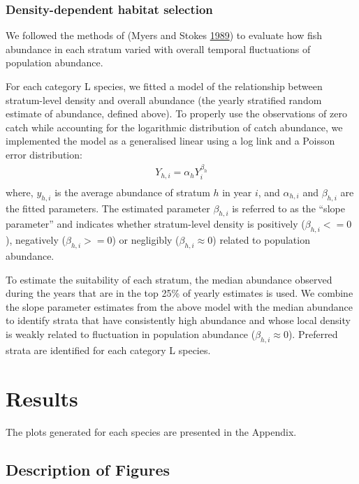 \documentclass[12pt]{article}\usepackage[]{graphicx}\usepackage[]{color}
\begin{document}
\hypertarget{density-dependent-habitat-selection}{%
\subsubsection{Density-dependent habitat selection}\label{density-dependent-habitat-selection}}

We followed the methods of (Myers and Stokes \protect\hyperlink{ref-Myers:Stokes:1989}{1989}) to evaluate how fish abundance in each stratum varied with overall temporal fluctuations of population abundance.

For each category L species, we fitted a model of the relationship between stratum-level density and overall abundance (the yearly stratified random estimate of abundance, defined above). To properly use the observations of zero catch while accounting for the logarithmic distribution of catch abundance, we implemented the model as a generalised linear using a log link and a Poisson error distribution:
\begin{eqnarray*}\label{eqHabitat Selection}
Y_{h,i} = \alpha_{h} Y_{i}^{\beta_h}
\\
\end{eqnarray*}
where, \(y_{h,i}\) is the average abundance of stratum \(h\) in year \(i\), and \(\alpha_{h,i}\) and \(\beta_{h,i}\) are the fitted parameters. The estimated parameter \(\beta_{h,i}\) is referred to as the ``slope parameter'' and indicates whether stratum-level density is positively (\(\beta_{h,i} <= 0\)), negatively (\(\beta_{h,i} >= 0\)) or negligibly (\(\beta_{h,i} \approx 0\)) related to population abundance.

To estimate the suitability of each stratum, the median abundance observed during the years that are in the top 25\% of yearly estimates is used. We combine the slope parameter estimates from the above model with the median abundance to identify strata that have consistently high abundance and whose local density is weakly related to fluctuation in population abundance (\(\beta_{h,i} \approx 0\)). Preferred strata are identified for each category L species.

\hypertarget{results}{%
\section{Results}\label{results}}

The plots generated for each species are presented in the Appendix.

\hypertarget{description-of-figures}{%
\subsection{Description of Figures}\label{description-of-figures}}
\end{document}
